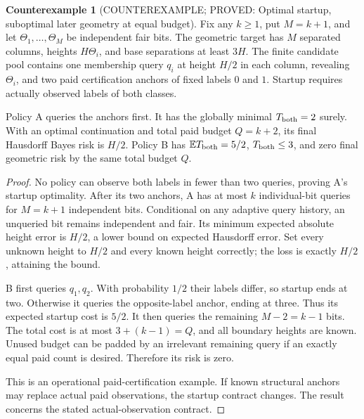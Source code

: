 \documentclass[11pt]{article}
\newcommand{\E}{\mathbb E}
\theoremstyle{definition}
\newtheorem{counterexample}[theorem]{Counterexample}
\theoremstyle{remark}
\begin{document}
\begin{counterexample}[COUNTEREXAMPLE; PROVED: Optimal startup, suboptimal later geometry at equal budget]
\label{rthreegeo:discoverygeometry}
Fix any $k\ge1$, put $M=k+1$, and let
$\Theta_1,\ldots,\Theta_M$ be independent fair bits.
The geometric target has $M$ separated columns, heights $H\Theta_i$,
and base separations at least $3H$.
The finite candidate pool contains one membership query $q_i$ at height
$H/2$ in each column, revealing $\Theta_i$, and two paid certification
anchors of fixed labels $0$ and $1$.
Startup requires actually observed labels of both classes.

Policy A queries the anchors first. It has the globally minimal
$T_{\rm both}=2$ surely. With an optimal continuation and total paid
budget $Q=k+2$, its final Hausdorff Bayes risk is $H/2$.
Policy B has $\E T_{\rm both}=5/2$, $T_{\rm both}\le3$, and zero final
geometric risk by the same total budget $Q$.
\end{counterexample}
\begin{proof}
No policy can observe both labels in fewer than two queries, proving
A's startup optimality. After its two anchors, A has at most $k$
individual-bit queries for $M=k+1$ independent bits.
Conditional on any adaptive query history, an unqueried bit remains
independent and fair. Its minimum expected absolute height error is
$H/2$, a lower bound on expected Hausdorff error.
Set every unknown height to $H/2$ and every known height correctly;
the loss is exactly $H/2$, attaining the bound.

B first queries $q_1,q_2$. With probability $1/2$ their labels differ,
so startup ends at two. Otherwise it queries the opposite-label anchor,
ending at three. Thus its expected startup cost is $5/2$.
It then queries the remaining $M-2=k-1$ bits. The total cost is at most
$3+(k-1)=Q$, and all boundary heights are known. Unused budget can be
padded by an irrelevant remaining query if an exactly equal paid count
is desired. Therefore its risk is zero.

This is an operational paid-certification example. If known structural
anchors may replace actual paid observations, the startup contract
changes. The result concerns the stated actual-observation contract.
\end{proof}
\end{document}

